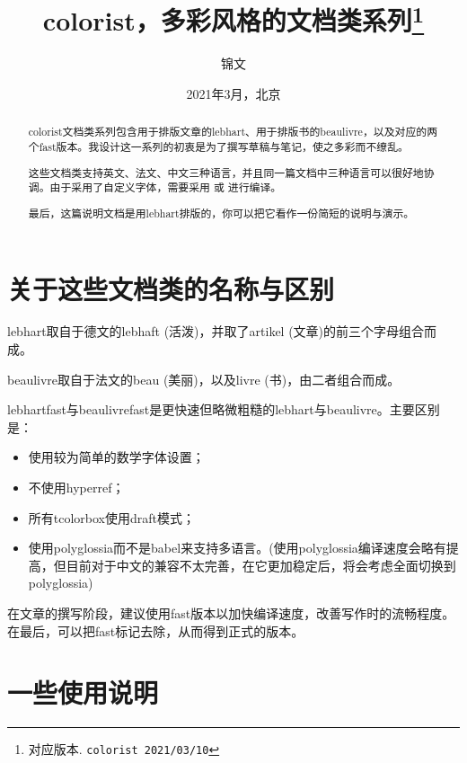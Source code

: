 \documentclass{lebhart}
\begin{document}
\title{colorist，多彩风格的文档类系列\thanks{对应版本. \texttt{colorist 2021/03/10}}}
\author{锦文}
\date{2021年3月，北京}

\maketitle

\begin{abstract}
    colorist文档类系列包含用于排版文章的lebhart、用于排版书的beaulivre，以及对应的两个fast版本。我设计这一系列的初衷是为了撰写草稿与笔记，使之多彩而不缭乱。

    这些文档类支持英文、法文、中文三种语言，并且同一篇文档中三种语言可以很好地协调。由于采用了自定义字体，需要采用  或  进行编译。
    
    最后，这篇说明文档是用lebhart排版的，你可以把它看作一份简短的说明与演示。
\end{abstract}

\noindent{}

\tableofcontents

\section{关于这些文档类的名称与区别}
lebhart取自于德文的lebhaft (活泼)，并取了artikel (文章)的前三个字母组合而成。

beaulivre取自于法文的beau (美丽)，以及livre (书)，由二者组合而成。

lebhartfast与beaulivrefast是更快速但略微粗糙的lebhart与beaulivre。主要区别是：
\begin{itemize}
    \item 使用较为简单的数学字体设置；
    \item 不使用hyperref；
    \item 所有tcolorbox使用draft模式；
    \item 使用polyglossia而不是babel来支持多语言。(使用polyglossia编译速度会略有提高，但目前对于中文的兼容不太完善，在它更加稳定后，将会考虑全面切换到polyglossia)
\end{itemize}

在文章的撰写阶段，建议使用fast版本以加快编译速度，改善写作时的流畅程度。在最后，可以把fast标记去除，从而得到正式的版本。

\section{一些使用说明}
\end{document}
